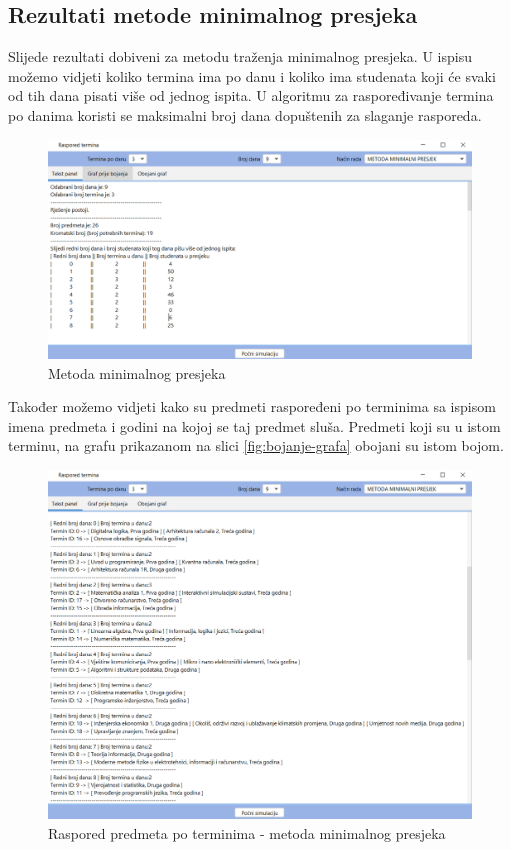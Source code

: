 \documentclass[times, utf8, zavrsni, numeric]{fer}
\begin{document}
\subsection{Rezultati metode minimalnog presjeka}
Slijede rezultati dobiveni za metodu traženja minimalnog presjeka. U ispisu možemo vidjeti koliko termina ima po danu i koliko ima studenata koji će svaki od tih dana pisati više od jednog ispita. U algoritmu za raspoređivanje termina po danima koristi se maksimalni broj dana dopuštenih za slaganje rasporeda.
\begin{figure}[h!]
	\centering
	\includegraphics[width=1\columnwidth]{slike/minMetoda.png}
	\caption{Metoda minimalnog presjeka}
	\label{fig:min-metoda}
\end{figure}
Također možemo vidjeti kako su predmeti raspoređeni po terminima sa ispisom imena predmeta i godini na kojoj se taj predmet sluša. Predmeti koji su u istom terminu, na grafu prikazanom na slici \ref{fig:bojanje-grafa} obojani su istom bojom. 

\begin{figure}[h!]
	\centering
	\includegraphics[width=1\columnwidth]{slike/predmetiMinMetoda.png}
	\caption{Raspored predmeta po terminima - metoda minimalnog presjeka}
	\label{fig:predmetiMinMetoda}
\end{figure}
\end{document}
